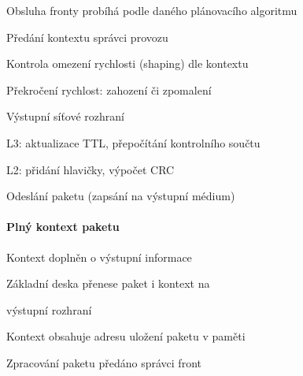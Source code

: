 \begin{compactenum}
\begin{compactitem}
        \item Obsluha fronty probíhá podle daného plánovacího algoritmu
    \end{compactitem}
    \item Předání kontextu správci provozu \begin{compactitem}
        \item Kontrola omezení rychlosti (shaping) dle kontextu
        \item Překročení rychlost: zahození či zpomalení
    \end{compactitem}
    \item Výstupní síťové rozhraní \begin{compactitem}
        \item L3: aktualizace TTL, přepočítání kontrolního součtu
        \item L2: přidání hlavičky, výpočet CRC
        \item Odeslání paketu (zapsání na výstupní médium)
    \end{compactitem}
\end{compactenum}

\paragraph*{Plný kontext paketu} \begin{compactitem}
    \item Kontext doplněn o výstupní informace
    \item Základní deska přenese paket i kontext na
    \item výstupní rozhraní
    \item Kontext obsahuje adresu uložení paketu v paměti
    \item Zpracování paketu předáno správci front
\end{compactitem}


